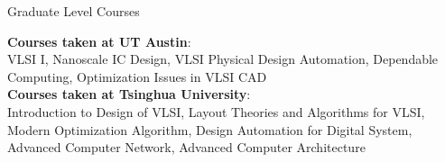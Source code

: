 \begin{rSection}{Graduate Level Courses}

	\textbf{Courses taken at UT Austin}:\\	
	VLSI I, Nanoscale IC Design, VLSI Physical Design Automation, Dependable Computing, Optimization Issues in VLSI CAD\\

	\textbf{Courses taken at Tsinghua University}:\\
	Introduction to Design of VLSI, Layout Theories and Algorithms for VLSI, Modern Optimization Algorithm, Design Automation for Digital System, Advanced Computer Network, Advanced Computer Architecture

\end{rSection}
